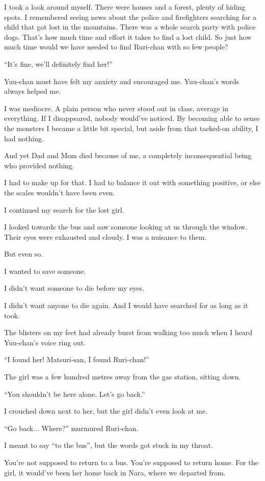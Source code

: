 I took a look around myself. There were houses and a forest, plenty of hiding spots. I remembered seeing news about the police and firefighters searching for a child that got lost in the mountains. There was a whole search party with police dogs. That's how much time and effort it takes to find a lost child. So just how much time would we have needed to find Ruri-chan with so few people?

``It's fine, we'll definitely find her!''

Yuu-chan must have felt my anxiety and encouraged me. Yuu-chan's words always helped me.

I was mediocre. A plain person who never stood out in class, average in everything. If I disappeared, nobody would've noticed. By becoming able to sense the monsters I became a little bit special, but aside from that tacked-on ability, I had nothing.

And yet Dad and Mom died because of me, a completely inconsequential being who provided nothing.

I had to make up for that. I had to balance it out with something positive, or else the scales wouldn't have been even.

I continued my search for the lost girl.

I looked towards the bus and saw someone looking at us through the window. Their eyes were exhausted and cloudy. I was a nuisance to them.

But even so.

I wanted to save someone.

I didn't want someone to die before my eyes.

I didn't want anyone to die again. And I would have searched for as long as it took.

The blisters on my feet had already burst from walking too much when I heard Yuu-chan's voice ring out.

``I found her! Matsuri-san, I found Ruri-chan!''

The girl was a few hundred metres away from the gas station, sitting down.

``You shouldn't be here alone. Let's go back.''

I crouched down next to her, but the girl didn't even look at me.

``Go back... Where?'' murmured Ruri-chan.

I meant to say ``to the bus'', but the words got stuck in my throat.

You're not supposed to return to a bus. You're supposed to return home. For the girl, it would've been her home back in Nara, where we departed from.

